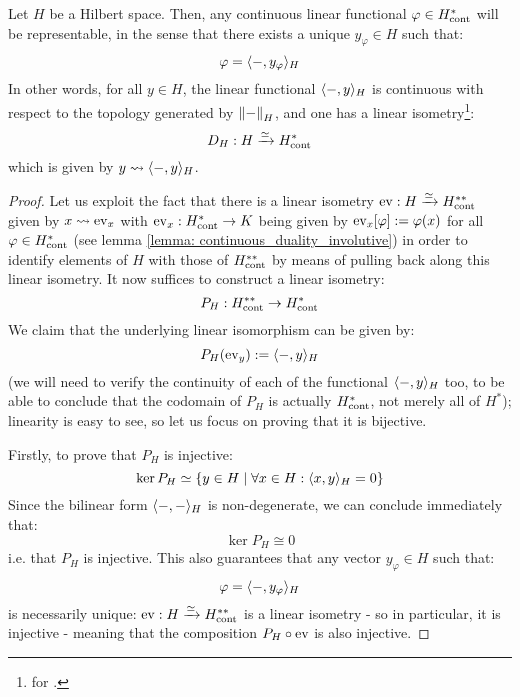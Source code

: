         \begin{theorem} \label{theorme: riesz_representation_theorem}
            Let $H$ be a Hilbert space. Then, any continuous linear functional $\varphi \in H^*_{\mathrm{cont}}$ will be representable, in the sense that there exists a unique $y_{\varphi} \in H$ such that:
                $$\varphi = \langle-, y_{\varphi}\rangle_H$$
            In other words, for all $y \in H$, the linear functional $\langle-, y\rangle_H$ is continuous with respect to the topology generated by $\left\| {-} \right\|_H$, and one has a linear isometry\footnote{ for .}:
                $$D_H: H \xrightarrow[]{\simeq} H^*_{\mathrm{cont}}$$
            which is given by $y \leadsto \langle-, y\rangle_H$.
        \end{theorem}
            \begin{proof}
                Let us exploit the fact that there is a linear isometry $\mathrm{ev}: H \xrightarrow[]{\simeq} H^{**}_{\mathrm{cont}}$ given by $x \leadsto \mathrm{ev}_x$ with $\mathrm{ev}_x: H^*_{\mathrm{cont}} \to K$ being given by $\mathrm{ev}_x[\varphi] := \varphi(x)$ for all $\varphi \in H^*_{\mathrm{cont}}$ (see lemma \ref{lemma: continuous_duality_involutive}) in order to identify elements of $H$ with those of $H^{**}_{\mathrm{cont}}$ by means of pulling back along this linear isometry. It now suffices to construct a linear isometry:
                    $$P_H: H^{**}_{\mathrm{cont}} \to H^*_{\mathrm{cont}}$$
                We claim that the underlying linear isomorphism can be given by:
                    $$P_H(\mathrm{ev}_y) := \langle-, y\rangle_H$$
                (we will need to verify the continuity of each of the functional $\langle-, y\rangle_H$ too, to be able to conclude that the codomain of $P_H$ is actually $H^*_{\mathrm{cont}}$, not merely all of $H^*$); linearity is easy to see, so let us focus on proving that it is bijective.
                
                Firstly, to prove that $P_H$ is injective:
                    $$\ker P_H \simeq \{ y \in H \mid \forall x \in H: \langle x, y\rangle_H = 0 \}$$
                Since the bilinear form $\langle-, -\rangle_H$ is non-degenerate, we can conclude immediately that:
                    $$\ker P_H \cong 0$$
                i.e. that $P_H$ is injective. This also guarantees that any vector $y_{\varphi} \in H$ such that:
                    $$\varphi = \langle-, y_{\varphi}\rangle_H$$
                is necessarily unique: $\mathrm{ev}: H \xrightarrow[]{\simeq} H^{**}_{\mathrm{cont}}$ is a linear isometry - so in particular, it is injective - meaning that the composition $P_H \circ \mathrm{ev}$ is also injective.
                

\end{proof}
